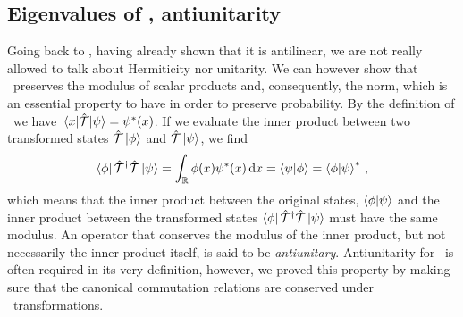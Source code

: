         \subsection{Eigenvalues of \hT, antiunitarity}
            Going back to \hT, having already shown that it is antilinear, we are not really allowed to talk about Hermiticity nor unitarity. We can however show that \hT\ preserves the modulus of scalar products and, consequently, the norm, which is an essential property to have in order to preserve probability. By the definition of \hT\ we have $\mel{x}{\hT}{\psi} = \psi^*\pqty{x}$. If we evaluate the inner product between two transformed states $\mathcal{\hat{T}}\ket{\phi}$ and $\mathcal{\hat{T}}\ket{\psi}$, we find
            \begin{equation*}
                \bra{\phi}\hT^\dag\hT\ket{\psi}
                = \int\nolimits_\bbR \phi\pqty{x}\psi^*\pqty{x}\dd{x}
                = \bra{\psi}\ket{\phi}
                = \bra{\phi}\ket{\psi}^*
                \mycomma
            \end{equation*}
            which means that the inner product between the original states, $\braket{\phi}{\psi}$ and the inner product between the transformed states $\bra{\phi}\mathcal{\hat{T}}^\dag\mathcal{\hat{T}}\ket{\psi}$ must have the same modulus. An operator that conserves the modulus of the inner product, but not necessarily the inner product itself, is said to be \emph{antiunitary}. Antiunitarity for \hT\ is often required in its very definition, however, we proved this property by making sure that the canonical commutation relations are conserved under \mcT\ transformations.
            

